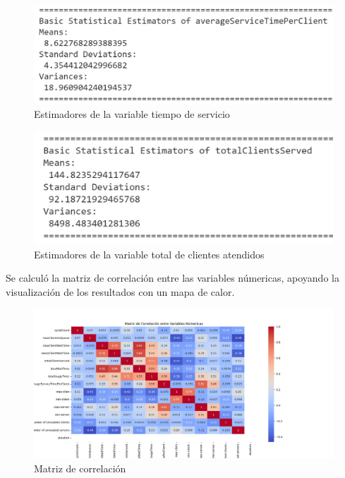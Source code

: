 \documentclass[12pt]{article}
\begin{document}
\begin{figure}[H]
\centering
\includegraphics[width=1.2\textwidth]{tiempo de servicio estimadores.png}
\caption{Estimadores de la variable tiempo de servicio}
\end{figure}

\begin{figure}[H]
\centering
\includegraphics[width=1.2\textwidth]{total de clientes servidos estimadores.png}
\caption{Estimadores de la variable total de clientes atendidos}
\end{figure}

Se calculó la matriz de correlación entre las variables númericas, apoyando la visualización de los resultados con un mapa de calor.

\begin{figure}[H]
\centering
\includegraphics[width=1.2\textwidth]{matriz.png}
\caption{Matriz de correlación}
\end{figure}
\end{document}
